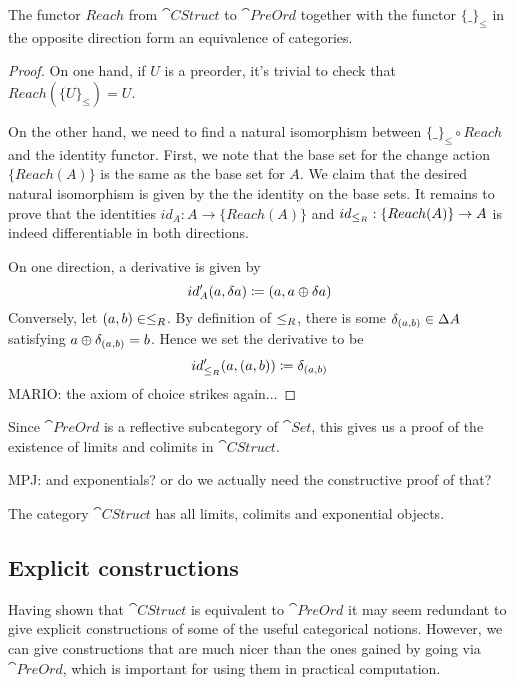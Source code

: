 \begin{thm}
  The functor $Reach$ from $\cat{CStruct}$ to $\cat{PreOrd}$ together with the 
  functor $\{\_\}_\leq$ in the opposite direction form an equivalence of categories.
\end{thm}
\begin{proof}
  On one hand, if $U$ is a preorder, it's trivial to check that $Reach (\{U\}_\leq) = U$.

  On the other hand, we need to find a natural isomorphism between $\{\_\}_\leq \circ Reach$
  and the identity functor. First, we note that the base set for the change action $\{Reach(A)\}$ is
  the same as the base set for $A$. We claim that the desired natural isomorphism is given by the
  the identity on the base sets. It remains to prove that the identities
  $id_A : A \rightarrow \{Reach(A)\}$ and $id_{\leq_R} : \{Reach(A)\} \rightarrow A$
  is indeed differentiable in both directions.

  On one direction, a derivative is given by
  $$
    id'_A(a, \delta a) \coloneqq (a, a \oplus \delta a)
  $$
  Conversely, let $(a, b) \in \leq_R$. By definition of $\leq_R$, there is some
  $\delta_{(a, b)} \in \Delta A$ satisfying $a \oplus \delta_{(a,b)} = b$. Hence we set the
  derivative to be
  $$
    id'_{\leq_R}(a, (a, b)) \coloneqq \delta_{(a, b)}
  $$
  MARIO: the axiom of choice strikes again...
\end{proof}

Since $\cat{PreOrd}$ is a reflective subcategory of $\cat{Set}$, this gives us a proof
of the existence of limits and colimits in $\cat{CStruct}$.

MPJ: and exponentials? or do we actually need the constructive proof of that?

\begin{corollary}
  The category $\cat{CStruct}$ has all limits, colimits and exponential objects. 
\end{corollary}

\subsection{Explicit constructions}

Having shown that $\cat{CStruct}$ is equivalent to $\cat{PreOrd}$ it may seem
redundant to give explicit constructions of some of the useful categorical
notions. However, we can give constructions that are much nicer than the ones
gained by going via $\cat{PreOrd}$, which is important for using them in
practical computation.

